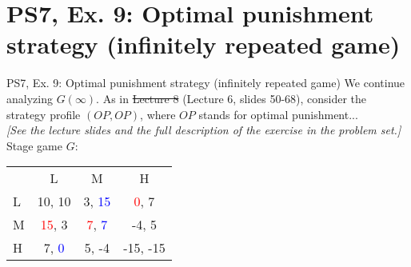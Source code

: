 \section{PS7, Ex. 9: Optimal punishment strategy (infinitely repeated game)}

\begin{frame}{PS7, Ex. 9: Optimal punishment strategy (infinitely repeated game)}
    We continue analyzing $G(\infty)$. As in \sout{Lecture 8} (Lecture 6, slides 50-68), consider the strategy profile $(OP,OP)$, where $OP$ stands for optimal punishment...\\\medskip
    \textit{[See the lecture slides and the full description of the exercise in the problem set.]}\\\medskip
    Stage game $G$:\vspace{-6pt}
    \begin{table}
      \begin{tabular}{l|c|c|c|}
        \multicolumn{1}{c}{} & \multicolumn{1}{c}{L} & \multicolumn{1}{c}{M} & \multicolumn{1}{c}{H} \\\cline{2-4}
        L & 10, 10 & 3, \textcolor{blue}{15} & \textcolor{red}{0}, 7 \\\cline{2-4}
        M & \textcolor{red}{15}, 3 & \textcolor{red}{7}, \textcolor{blue}{7} & -4, 5 \\\cline{2-4}
        H & 7, \textcolor{blue}{0} & 5, -4 & -15, -15 \\\cline{2-4}
      \end{tabular}
    \end{table}
\end{frame}

